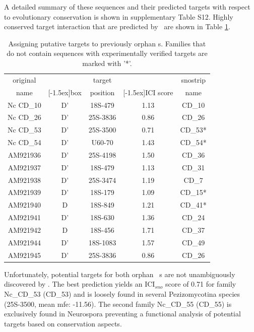 A detailed summary of these sequences and their predicted targets with
respect to evolutionary conservation is shown in supplementary Table S12. Highly conserved
target interaction that are predicted by \snostrip\ are shown in Table \ref{tab:orphan_cd_snoRNAs_short}. 

\begin{table}
  \caption{Assigning putative targets to previously
    orphan \cd s. Families that do not contain sequences with
    experimentally verified targets are marked with '*'. }
  \label{tab:orphan_cd_snoRNAs_short}
  \begin{center}
    \begin{footnotesize}
      \begin{tabular}{c|c|c|c|c}
      original&&target&&snostrip\\
      name&\raisebox{1.5ex}[-1.5ex]{box}&position&\raisebox{1.5ex}[-1.5ex]{ICI
      score}&name\\
  \hline
  Nc CD\_10&D'&18S-479&1.13&CD\_10\\
\hline
  Nc CD\_26&D'&25S-3836&0.86&CD\_26\\
\hline
  Nc CD\_53&D'&25S-3500&0.71&CD\_53*\\
\hline
  Nc CD\_54&D'&U60-70&1.43&CD\_54*\\
 \hline
  AM921936&D'&25S-4198&1.50&CD\_36\\
\hline
  AM921937&D'&18S-479&1.13&CD\_31\\
\hline
  AM921938&D'&25S-3474&1.19&CD\_7\\
\hline
  AM921939&D'&18S-179&1.09&CD\_15*\\
\hline
  AM921940&D&18S-849&1.21&CD\_41*\\
\hline
  AM921941&D'&18S-630&1.36&CD\_24\\
\hline
  AM921942&D&18S-456&1.71&CD\_37\\
\hline
  AM921944&D'&18S-1083&1.57&CD\_49\\
\hline
  AM921945&D'&25S-3836&0.86&CD\_26\\

    \end{tabular}
    \end{footnotesize}
  \end{center} 
\end{table}

Unfortunately, potential targets for both orphan \ncr\ \sno s are not
unambiguously discovered by \snostrip. The best prediction yields an
ICI$_{sno}$ score of 0.71 for family Nc\_CD\_53 (CD\_53) and is loosely found in
several Pezizomycotina species (25S-3500, mean mfe: -11.56). The
second family Nc\_CD\_55 (CD\_55) is exclusively found in Neurospora preventing a
functional analysis of potential targets based on conservation aspects. 

